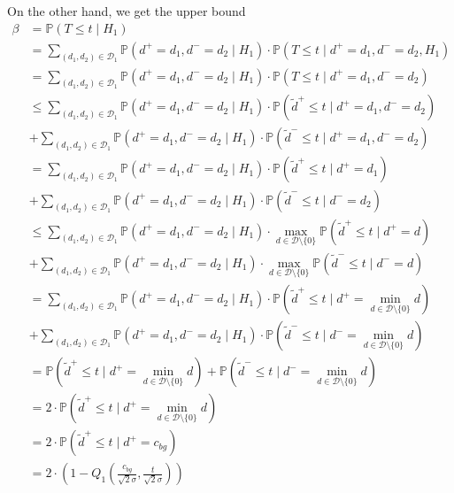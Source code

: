 \documentclass[a4paper,12pt]{article}
\theoremstyle{plain}
\theoremstyle{definition}
\theoremstyle{remark}
\begin{document}
On the other hand, we get the upper bound
\begin{align*}
	\beta &= \mathbb{P}(T \leq t \mid H_1) \\
	&= \sum_{(d_1, d_2) \in \mathcal{D}_1} \mathbb{P}(d^+ = d_1, d^- = d_2 \mid H_1) \cdot \mathbb{P}(T \leq t \mid d^+ = d_1, d^- = d_2, H_1) \\
	&= \sum_{(d_1, d_2) \in \mathcal{D}_1} \mathbb{P}(d^+ = d_1, d^- = d_2 \mid H_1) \cdot \mathbb{P}(T \leq t \mid d^+ = d_1, d^- = d_2) \\
	&\leq \sum_{(d_1, d_2) \in \mathcal{D}_1} \mathbb{P}(d^+ = d_1, d^- = d_2 \mid H_1) \cdot \mathbb{P}(\tilde{d}^+ \leq t \mid d^+ = d_1, d^- = d_2) \\
	&+ \sum_{(d_1, d_2) \in \mathcal{D}_1} \mathbb{P}(d^+ = d_1, d^- = d_2 \mid H_1) \cdot \mathbb{P}(\tilde{d}^- \leq t \mid d^+ = d_1, d^- = d_2) \\
	&= \sum_{(d_1, d_2) \in \mathcal{D}_1} \mathbb{P}(d^+ = d_1, d^- = d_2 \mid H_1) \cdot \mathbb{P}(\tilde{d}^+ \leq t \mid d^+ = d_1) \\
	&+ \sum_{(d_1, d_2) \in \mathcal{D}_1} \mathbb{P}(d^+ = d_1, d^- = d_2 \mid H_1) \cdot \mathbb{P}(\tilde{d}^- \leq t \mid d^- = d_2) \\
	&\leq \sum_{(d_1, d_2) \in \mathcal{D}_1} \mathbb{P}(d^+ = d_1, d^- = d_2 \mid H_1) \cdot \max_{d \in \mathcal{D} \setminus \{ 0 \}} \mathbb{P}(\tilde{d}^+ \leq t \mid d^+ = d) \\
	&+ \sum_{(d_1, d_2) \in \mathcal{D}_1} \mathbb{P}(d^+ = d_1, d^- = d_2 \mid H_1) \cdot \max_{d \in \mathcal{D} \setminus \{ 0 \}} \mathbb{P}(\tilde{d}^- \leq t \mid d^- = d) \\
	&= \sum_{(d_1, d_2) \in \mathcal{D}_1} \mathbb{P}(d^+ = d_1, d^- = d_2 \mid H_1) \cdot \mathbb{P}(\tilde{d}^+ \leq t \mid d^+ = \min_{d \in \mathcal{D} \setminus \{ 0 \}} d) \\
	&+ \sum_{(d_1, d_2) \in \mathcal{D}_1} \mathbb{P}(d^+ = d_1, d^- = d_2 \mid H_1) \cdot \mathbb{P}(\tilde{d}^- \leq t \mid d^- = \min_{d \in \mathcal{D} \setminus \{ 0 \}} d) \\
	&= \mathbb{P}(\tilde{d}^+ \leq t \mid d^+ = \min_{d \in \mathcal{D} \setminus \{ 0 \}} d) + \mathbb{P}(\tilde{d}^- \leq t \mid d^- = \min_{d \in \mathcal{D} \setminus \{ 0 \}} d) \\
	&= 2 \cdot \mathbb{P}(\tilde{d}^+ \leq t \mid d^+ = \min_{d \in \mathcal{D} \setminus \{ 0 \}} d) \\
	&= 2 \cdot \mathbb{P}(\tilde{d}^+ \leq t \mid d^+ = c_{bg}) \\
	&= 2 \cdot \left( 1 - Q_1 \left( \frac{c_{bg}}{\sqrt{2} \sigma}, \frac{t}{\sqrt{2} \sigma} \right) \right)
\end{align*}
\end{document}
